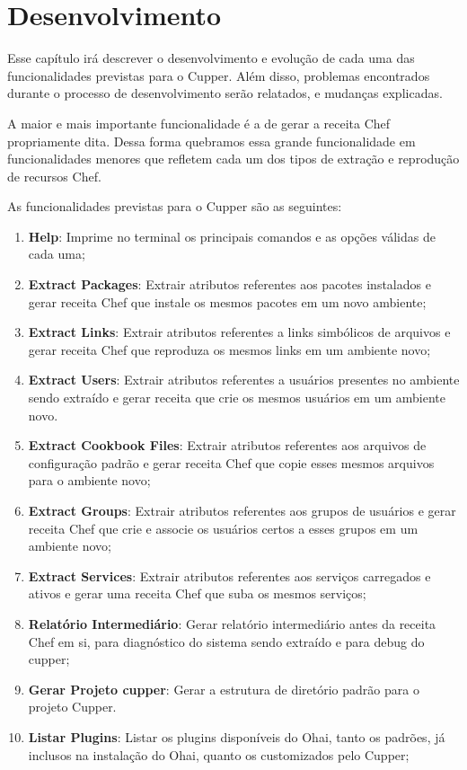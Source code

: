 \newpage\null\thispagestyle{empty}\newpage
\chapter{Desenvolvimento}
\label{chap:dev}

Esse capítulo irá descrever o desenvolvimento e evolução de cada uma das funcionalidades
previstas para o Cupper. Além disso, problemas encontrados durante o processo
de desenvolvimento serão relatados, e mudanças explicadas.

A maior e mais importante funcionalidade é a de gerar a receita Chef propriamente dita.
Dessa forma quebramos essa grande funcionalidade em funcionalidades menores que refletem cada
um dos tipos de extração e reprodução de recursos Chef.

As funcionalidades previstas para o Cupper são as seguintes:

\begin{enumerate}
  \item \textbf{Help}: Imprime no terminal os principais comandos e as opções
válidas de cada uma;
  \item \textbf{Extract Packages}: Extrair atributos referentes aos pacotes
instalados e gerar receita Chef que instale os mesmos pacotes em um novo ambiente;
  \item \textbf{Extract Links}: Extrair atributos referentes a links simbólicos
de arquivos e gerar receita Chef que reproduza os mesmos links em um ambiente novo;
  \item \textbf{Extract Users}: Extrair atributos referentes a usuários presentes
no ambiente sendo extraído e gerar receita que crie os mesmos usuários em um
ambiente novo.
  \item \textbf{Extract Cookbook Files}: Extrair atributos referentes aos arquivos
de configuração padrão e gerar receita Chef que copie esses mesmos arquivos para o ambiente novo;
  \item \textbf{Extract Groups}: Extrair atributos referentes aos grupos de usuários
e gerar receita Chef que crie e associe os usuários certos a esses grupos em um
ambiente novo;
  \item \textbf{Extract Services}: Extrair atributos referentes aos serviços carregados
e ativos e gerar uma receita Chef que suba os mesmos serviços;
  \item \textbf{Relatório Intermediário}: Gerar relatório intermediário antes
da receita Chef em si, para diagnóstico do sistema sendo extraído e para debug
do cupper;
  \item \textbf{Gerar Projeto cupper}: Gerar a estrutura de diretório padrão 
para o projeto Cupper.
  \item \textbf{Listar Plugins}: Listar os plugins disponíveis do Ohai, tanto 
os padrões, já inclusos na instalação do Ohai, quanto os customizados pelo Cupper;

\end{enumerate}

